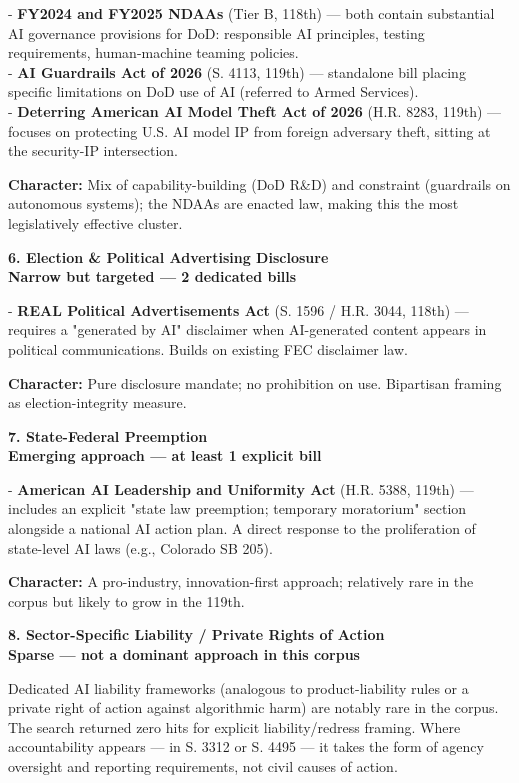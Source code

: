 \documentclass[11pt]{article}
\begin{document}
- \textbf{FY2024 and FY2025 NDAAs} (Tier B, 118th) --- both contain substantial AI governance provisions for DoD: responsible AI principles, testing requirements, human-machine teaming policies. \\
- \textbf{AI Guardrails Act of 2026} (S. 4113, 119th) --- standalone bill placing specific limitations on DoD use of AI (referred to Armed Services). \\
- \textbf{Deterring American AI Model Theft Act of 2026} (H.R. 8283, 119th) --- focuses on protecting U.S. AI model IP from foreign adversary theft, sitting at the security-IP intersection.

\textbf{Character:} Mix of capability-building (DoD R\&D) and constraint (guardrails on autonomous systems); the NDAAs are enacted law, making this the most legislatively effective cluster.

\textbf{6. Election \& Political Advertising Disclosure} \\
\textbf{Narrow but targeted --- 2 dedicated bills}

- \textbf{REAL Political Advertisements Act} (S. 1596 / H.R. 3044, 118th) --- requires a "generated by AI" disclaimer when AI-generated content appears in political communications. Builds on existing FEC disclaimer law.

\textbf{Character:} Pure disclosure mandate; no prohibition on use. Bipartisan framing as election-integrity measure.

\textbf{7. State-Federal Preemption} \\
\textbf{Emerging approach --- at least 1 explicit bill}

- \textbf{American AI Leadership and Uniformity Act} (H.R. 5388, 119th) --- includes an explicit "state law preemption; temporary moratorium" section alongside a national AI action plan. A direct response to the proliferation of state-level AI laws (e.g., Colorado SB 205).

\textbf{Character:} A pro-industry, innovation-first approach; relatively rare in the corpus but likely to grow in the 119th.

\textbf{8. Sector-Specific Liability / Private Rights of Action} \\
\textbf{Sparse --- not a dominant approach in this corpus}

Dedicated AI liability frameworks (analogous to product-liability rules or a private right of action against algorithmic harm) are notably rare in the corpus. The search returned zero hits for explicit liability/redress framing. Where accountability appears --- in S. 3312 or S. 4495 --- it takes the form of agency oversight and reporting requirements, not civil causes of action.
\end{document}
